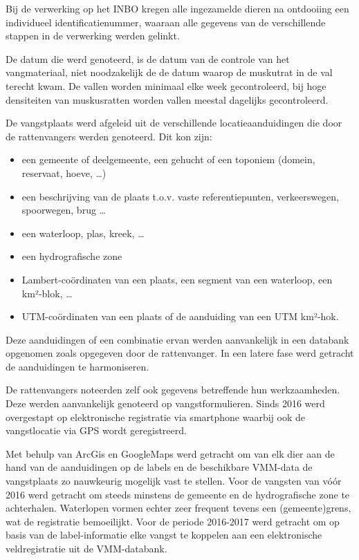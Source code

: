 \documentclass[twoside]{extreport}
\begin{document}
Bij de verwerking op het INBO kregen alle ingezamelde dieren na
ontdooiing een individueel identificatienummer, waaraan alle gegevens
van de verschillende stappen in de verwerking werden gelinkt.

De datum die werd genoteerd, is de datum van de controle van het
vangmateriaal, niet noodzakelijk de de datum waarop de muskutrat in de
val terecht kwam. De vallen worden minimaal elke week gecontroleerd, bij
hoge densiteiten van muskusratten worden vallen meestal dagelijks
gecontroleerd.

De vangstplaats werd afgeleid uit de verschillende locatieaanduidingen
die door de rattenvangers werden genoteerd. Dit kon zijn:

\begin{itemize}
\tightlist
\item
  een gemeente of deelgemeente, een gehucht of een toponiem (domein,
  reservaat, hoeve, \ldots{})
\item
  een beschrijving van de plaats t.o.v. vaste referentiepunten,
  verkeerswegen, spoorwegen, brug \ldots{}
\item
  een waterloop, plas, kreek, \ldots{}
\item
  een hydrografische zone
\item
  Lambert-coördinaten van een plaats, een segment van een waterloop, een
  km²-blok, \ldots{}
\item
  UTM-coördinaten van een plaats of de aanduiding van een UTM km²-hok.
\end{itemize}

Deze aanduidingen of een combinatie ervan werden aanvankelijk in een
databank opgenomen zoals opgegeven door de rattenvanger. In een latere
fase werd getracht de aanduidingen te harmoniseren.

De rattenvangers noteerden zelf ook gegevens betreffende hun
werkzaamheden. Deze werden aanvankelijk genoteerd op vangstformulieren.
Sinds 2016 werd overgestapt op elektronische registratie via smartphone
waarbij ook de vangstlocatie via GPS wordt geregistreerd.

Met behulp van ArcGis en GoogleMaps werd getracht om van elk dier aan de
hand van de aanduidingen op de labels en de beschikbare VMM-data de
vangstplaats zo nauwkeurig mogelijk vast te stellen. Voor de vangsten
van vóór 2016 werd getracht om steeds minstens de gemeente en de
hydrografische zone te achterhalen. Waterlopen vormen echter zeer
frequent tevens een (gemeente)grens, wat de registratie bemoeilijkt.
Voor de periode 2016-2017 werd getracht om op basis van de
label-informatie elke vangst te koppelen aan een elektronische
veldregistratie uit de VMM-databank.
\end{document}
